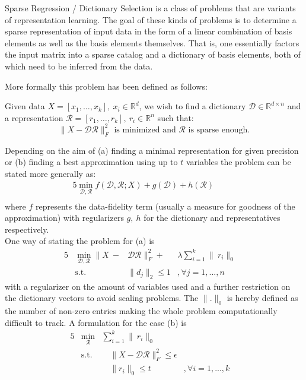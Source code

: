 \documentclass{article}
\newcommand{\R}{\mathbb{R}}
\begin{document}
\noindent Sparse Regression / Dictionary Selection is a class of problems that are variants of representation learning. The goal of these kinds of problems is to determine a sparse representation of input data in the form of a linear combination of basis elements as well as the basis elements themselves. That is, one essentially factors the input matrix into a sparse catalog and a dictionary of basis elements, both of which need to be inferred from the data.
\newline

\noindent More formally this problem has been defined as follows:
\newline

Given data $X = [x_1,\dots , x_k], \ x_i\in\R^d$, we wish to find a dictionary $\mathcal{D}\in\R^{d \times n}$ and a representation $\mathcal{R} = [r_1, \dots, r_k], \ r_i\in\R^n$ such that: $$\|X-\mathcal{D}\mathcal{R}\|_F^2 \text{ is minimized and } \mathcal{R} \text{ is sparse enough.}$$

\noindent Depending on the aim of (a) finding a minimal representation for given precision or (b) finding a best approximation using up to $t$ variables the problem can be stated more generally as:
\begin{alignat*}{5}
          \min_{\mathcal{D}, \mathcal{R}}  f(\mathcal{D}, \mathcal{R}; X) + g(\mathcal{D}) + h(\mathcal{R})      & \quad  & \\
\end{alignat*}
where $f$ represents the data-fidelity term (usually a measure for goodness of the approximation) with regularizers $g,\ h$ for the dictionary and representatives respectively.
\\
One way of stating the problem for (a) is
\begin{alignat}{5}
         & \min_{\mathcal{D}, \mathcal{R}} \|X \ -&\mathcal{D}\mathcal{R}\|_F^2  + &\lambda \sum_{i=1}^k  \|\ r_i\|_0     \quad   \\
         &\text{s.t.}  \quad  &\|d_j\|_2 \leq 1&, \forall j=1, ...,n  \quad 
\end{alignat}
with a regularizer on the amount of variables used and a further restriction on the dictionary vectors to avoid scaling problems. The $\| .\|_0$ is hereby defined as the number of non-zero entries making the whole problem computationally difficult to track\cite{NPHardproof}. A formulation for the case (b) is 
\begin{alignat}{5}
          &\min_{\mathcal{R}} &\sum_{i=1}^k  \|\ r_i\|_0     \quad  & \\
         &\text{s.t.}  &\quad  \|X-\mathcal{D}\mathcal{R}\|_F^2 \leq \epsilon & \quad \\
          & \ & \quad  \| r_i \|_0 \leq t  &, \forall i=1, ..., k  \quad 
\end{alignat}
\end{document}
